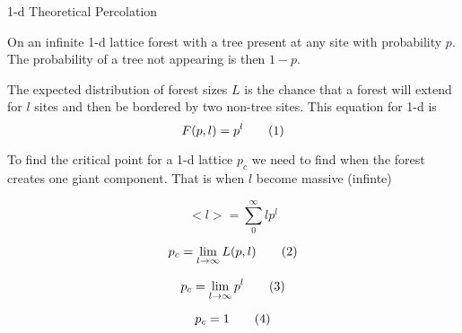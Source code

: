 1-d Theoretical Percolation

On an infinite 1-d lattice forest with a tree present at any site with probability $p$. The probability of a tree not appearing is then $1 - p$. 

The expected distribution of forest sizes $L$ is the chance that a forest will extend for $l$ sites and then be bordered by two non-tree sites. This equation for 1-d is
\[
  F(p, l)
  =
    p^l
  \addtag
\]

To find the critical point for a 1-d lattice $p_c$ we need to find when the forest creates one giant component. That is when $l$ become massive (infinte)

\[
  <l> = \sum_0^{\infty} l p^l
\]

\[
  p_c = 
    \lim_{l \to \infty} L(p,l)
  \addtag
\]

\[
  p_c = 
    \lim_{l \to \infty} p^l 
  \addtag
\]

\[
  p_c = 1
  \addtag
\]